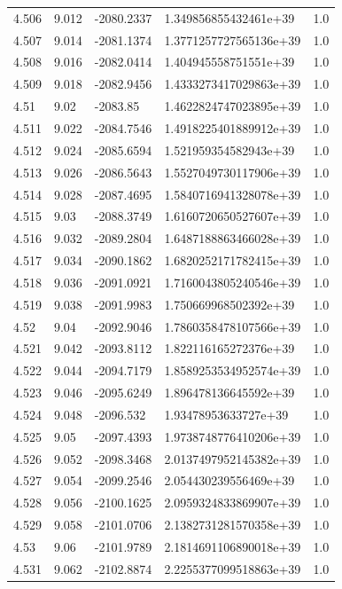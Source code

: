 \begin{tabular}{lllll}
4.506 & 9.012 & -2080.2337 & 1.349856855432461e+39 & 1.0 \\
4.507 & 9.014 & -2081.1374 & 1.3771257727565136e+39 & 1.0 \\
4.508 & 9.016 & -2082.0414 & 1.404945558751551e+39 & 1.0 \\
4.509 & 9.018 & -2082.9456 & 1.4333273417029863e+39 & 1.0 \\
4.51 & 9.02 & -2083.85 & 1.4622824747023895e+39 & 1.0 \\
4.511 & 9.022 & -2084.7546 & 1.4918225401889912e+39 & 1.0 \\
4.512 & 9.024 & -2085.6594 & 1.521959354582943e+39 & 1.0 \\
4.513 & 9.026 & -2086.5643 & 1.5527049730117906e+39 & 1.0 \\
4.514 & 9.028 & -2087.4695 & 1.5840716941328078e+39 & 1.0 \\
4.515 & 9.03 & -2088.3749 & 1.6160720650527607e+39 & 1.0 \\
4.516 & 9.032 & -2089.2804 & 1.6487188863466028e+39 & 1.0 \\
4.517 & 9.034 & -2090.1862 & 1.6820252171782415e+39 & 1.0 \\
4.518 & 9.036 & -2091.0921 & 1.7160043805240546e+39 & 1.0 \\
4.519 & 9.038 & -2091.9983 & 1.750669968502392e+39 & 1.0 \\
4.52 & 9.04 & -2092.9046 & 1.7860358478107566e+39 & 1.0 \\
4.521 & 9.042 & -2093.8112 & 1.822116165272376e+39 & 1.0 \\
4.522 & 9.044 & -2094.7179 & 1.8589253534952574e+39 & 1.0 \\
4.523 & 9.046 & -2095.6249 & 1.896478136645592e+39 & 1.0 \\
4.524 & 9.048 & -2096.532 & 1.93478953633727e+39 & 1.0 \\
4.525 & 9.05 & -2097.4393 & 1.9738748776410206e+39 & 1.0 \\
4.526 & 9.052 & -2098.3468 & 2.0137497952145382e+39 & 1.0 \\
4.527 & 9.054 & -2099.2546 & 2.054430239556469e+39 & 1.0 \\
4.528 & 9.056 & -2100.1625 & 2.0959324833869907e+39 & 1.0 \\
4.529 & 9.058 & -2101.0706 & 2.1382731281570358e+39 & 1.0 \\
4.53 & 9.06 & -2101.9789 & 2.1814691106890018e+39 & 1.0 \\
4.531 & 9.062 & -2102.8874 & 2.2255377099518863e+39 & 1.0 \\

\end{tabular}
